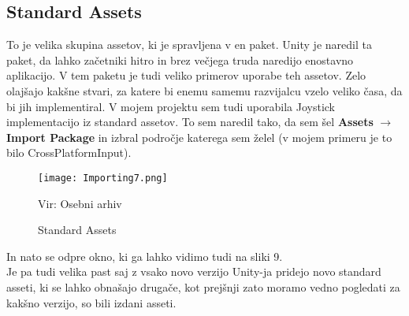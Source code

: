 {\color{indiagreen}\subsection{Standard Assets}}
To je velika skupina assetov, ki je spravljena v en paket. Unity je naredil ta paket, da lahko začetniki hitro in brez večjega truda naredijo enostavno aplikacijo. V tem paketu je tudi veliko primerov uporabe teh assetov. Zelo olajšajo kakšne stvari, za katere bi enemu samemu razvijalcu vzelo veliko časa, da bi jih implementiral. V mojem projektu sem tudi uporabila Joystick implementacijo iz standard assetov. To sem naredil tako, da sem šel \textbf{Assets} $\rightarrow$ \textbf{Import Package} in izbral področje katerega sem želel (v mojem primeru je to bilo CrossPlatformInput).\\
\begin{figure}[ht!]
	\centering
	\texttt{[image: Importing7.png]}
	\caption{Standard Assets}
	{\tiny Vir: Osebni arhiv}
\end{figure}
In nato se odpre okno, ki ga lahko vidimo tudi na sliki 9.\\
Je pa tudi velika past saj z vsako novo verzijo Unity-ja pridejo novo standard asseti, ki se lahko obnašajo drugače, kot prejšnji zato moramo vedno pogledati za kakšno verzijo, so bili izdani asseti.